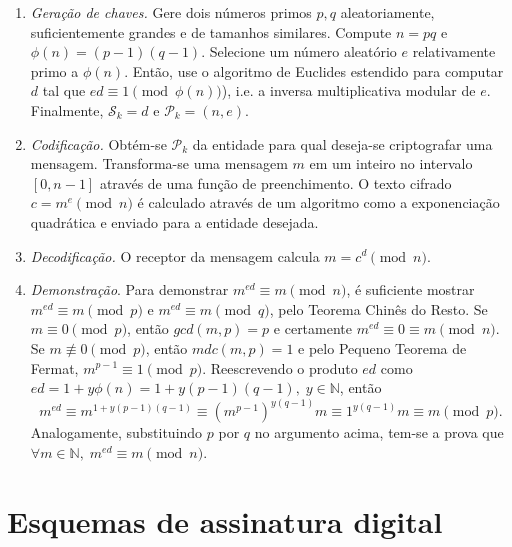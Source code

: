 \documentclass[12pt]{report}
\newcommand{\pk}{$\mathcal{P}_k$}
\begin{document}
\begin{enumerate}

  \item[] \emph{Geração de chaves.} Gere dois números primos $p, q$
    aleatoriamente, suficientemente grandes e de tamanhos similares. Compute
    $n = p q$ e $\phi(n) = (p - 1) (q - 1)$. Selecione um número aleatório $e$
    relativamente primo a $\phi(n)$. Então, use o algoritmo de Euclides
    estendido para computar $d$ tal que $ed \equiv 1 \pmod{\phi(n)}$), i.e.
    a inversa multiplicativa modular de $e$. Finalmente, $\mathcal{S}_k = d$ e
    $\mathcal{P}_k = (n, e)$.

  \item[] \emph{Codificação.} Obtém-se \pk{} da entidade para qual
    deseja-se criptografar uma mensagem. Transforma-se uma mensagem $m$ em um
    inteiro no intervalo $[0, n - 1]$ através de uma função de preenchimento.
    O texto cifrado $c = m^e \pmod{n}$ é calculado através de um algoritmo
    como a exponenciação quadrática e enviado para a entidade desejada.

  \item[] \emph{Decodificação.} O receptor da mensagem calcula $m = c^d
    \pmod{n}$.

  \item[] \emph{Demonstração}. Para demonstrar $m^{ed} \equiv m \pmod{n}$, é
    suficiente mostrar $m^{ed} \equiv m \pmod{p}$ e $m^{ed} \equiv m \pmod{q}$,
    pelo Teorema Chinês do Resto. Se $m \equiv 0 \pmod{p}$, então
    $gcd(m, p) = p$ e certamente $m^{ed} \equiv 0 \equiv m \pmod{n}$.
    Se $m \not\equiv 0 \pmod{p}$, então $mdc(m, p) = 1$ e pelo Pequeno Teorema
    de Fermat, $m^{p - 1} \equiv 1 \pmod{p}$. Reescrevendo o produto $ed$ como
    $ed = 1 + y\phi(n) = 1 + y(p - 1)(q - 1), \; y \in \mathbb{N}$, então
    \begin{equation}
      m^{ed} \equiv m^{1 + y(p-1)(q-1)} \equiv (m^{p-1})^{y(q-1)}m
        \equiv 1^{y(q-1)}m \equiv m \pmod{p}.
    \end{equation}
    Analogamente, substituindo $p$ por $q$ no argumento acima, tem-se a prova
    que $\forall m \in \mathbb{N}, \; m^{ed} \equiv m \pmod{n}$.

\end{enumerate}

\section{Esquemas de assinatura digital}
\end{document}
